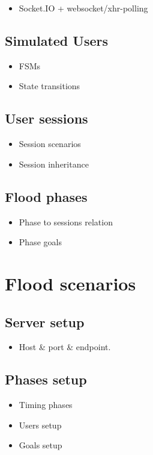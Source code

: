 \documentclass[a4paper]{article}
\begin{document}
\begin{itemize}
\item Socket.IO + websocket/xhr-polling
\end{itemize}
\subsection{Simulated Users}
\label{sec-2-2}


\begin{itemize}
\item FSMs
\item State transitions
\end{itemize}
\subsection{User sessions}
\label{sec-2-3}


\begin{itemize}
\item Session scenarios
\item Session inheritance
\end{itemize}
\subsection{Flood phases}
\label{sec-2-4}


\begin{itemize}
\item Phase to sessions relation
\item Phase goals
\end{itemize}

\pagebreak
\section{Flood scenarios}
\label{sec-3}
\subsection{Server setup}
\label{sec-3-1}


\begin{itemize}
\item Host \& port \& endpoint.
\end{itemize}
\subsection{Phases setup}
\label{sec-3-2}


\begin{itemize}
\item Timing phases
\item Users setup
\item Goals setup
\end{itemize}
\end{document}
